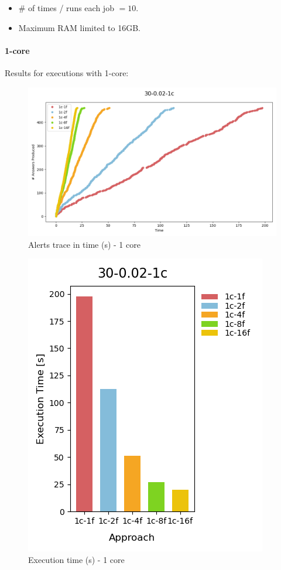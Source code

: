 \begin{itemize}
  \item \# of times / runs each job $=10$.
  \item Maximum RAM limited to 16GB.
\end{itemize}

\paragraph{1-core\\}

Results for executions with 1-core:

\begin{figure}[H]
  \centering
  \includegraphics[scale = 0.5]{images/4-Experiments/E2/30-0.02-1c/traces.png}
  \caption{Alerts trace in time (s) - 1 core}
\end{figure}

\begin{figure}[H]
  \centering
  \includegraphics[scale = 0.5]{images/4-Experiments/E2/30-0.02-1c/execTime.png}
  \caption{Execution time (s) - 1 core}
\end{figure}

